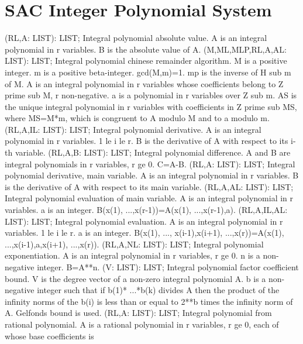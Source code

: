 \section{ SAC Integer Polynomial System  } 
 (RL,A: LIST): LIST; \eproc
\bcom Integral polynomial absolute value. A is an integral polynomial in
r variables. B is the absolute value of A. \ecom 
{} (M,ML,MLP,RL,A,AL: LIST): LIST; \eproc
\bcom Integral polynomial chinese remainder algorithm. M is a positive
integer.  m is a positive beta-integer.  gcd(M,m)=1.  mp is the
inverse of H sub m of M.  A is an integral polynomial in r variables
whose coefficients belong to Z prime sub M, r non-negative.  a is a
polynomial in r variables over Z sub m.  AS is the unique integral
polynomial in r variables with coefficients in Z prime sub MS, where
MS=M*m, which is congruent to A modulo M and to a modulo m. \ecom 
{} (RL,A,IL: LIST): LIST; \eproc
\bcom Integral polynomial derivative. A is an integral polynomial in r
variables.  1 le i le r.  B is the derivative of A with respect to
its i-th variable. \ecom 
{} (RL,A,B: LIST): LIST; \eproc
\bcom Integral polynomial difference. A and B are integral polynomials in
r variables, r ge 0. C=A-B. \ecom 
{} (RL,A: LIST): LIST; \eproc
\bcom Integral polynomial derivative, main variable. A is an integral
polynomial in r variables.  B is the derivative of A with respect to
its main variable. \ecom 
{} (RL,A,AL: LIST): LIST; \eproc
\bcom Integral polynomial evaluation of main variable. A is an integral
polynomial in r variables.  a is an integer.
B(x(1), ...,x(r-1))=A(x(1), ...,x(r-1),a). \ecom 
{} (RL,A,IL,AL: LIST): LIST; \eproc
\bcom Integral polynomial evaluation. A is an integral polynomial
in r variables.  1 le i le r.  a is an integer.  B(x(1), ...,
x(i-1),x(i+1), ...,x(r))=A(x(1), ...,x(i-1),a,x(i+1), ...,x(r)). \ecom 
{} (RL,A,NL: LIST): LIST; \eproc
\bcom Integral polynomial exponentiation. A is an integral polynomial in
r variables, r ge 0. n is a non-negative integer. B=A**n. \ecom 
{} (V: LIST): LIST; \eproc
\bcom Integral polynomial factor coefficient bound. V is the degree vector
of a non-zero integral polynomial A.  b is a non-negative integer such
that if b(1)* ...*b(k) divides A then the product of the infinity norms
of the b(i) is less than or equal to 2**b times the infinity norm of A.
Gelfonds bound is used. \ecom 
{} (RL,A: LIST): LIST; \eproc
\bcom Integral polynomial from rational polynomial. A is a rational
polynomial in r variables, r ge 0, each of whose base coefficients is
